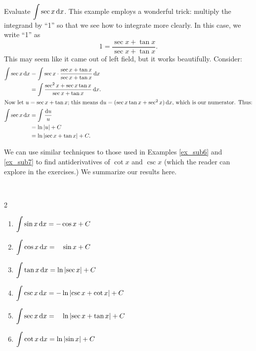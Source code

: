 \begin{example}\label{ex_sub7}%
Evaluate $\displaystyle\int \sec x\operatorname{d}\! x$.
\solution
This example employs a wonderful trick: multiply the integrand by ``1'' so that we see how to integrate more clearly. In this case, we write ``1'' as
\[1 = \frac{\sec x + \tan x}{\sec x + \tan x}.\]
This may seem like it came out of left field, but it works beautifully. Consider:
\begin{align*}
	\int \sec x\operatorname{d}\! x
	&= \int \sec x\cdot \frac{\sec x + \tan x}{\sec x + \tan x}\operatorname{d}\! x \\
	&= \int \frac{\sec^2 x + \sec x\tan x}{\sec x + \tan x}\operatorname{d}\! x.\\
\intertext{Now let \(u = \sec x+\tan x\); this means \(\operatorname{d}\!u = (\sec x\tan x+ \sec^2 x)\operatorname{d}\!x\), which is our numerator. Thus:}
	\int \sec x\operatorname{d}\! x
	&= \int \frac{\operatorname{d}\! u}{u} \\
	&= \ln \left\lvert u \right\rvert + C \\
	&= \ln \left\lvert \sec x+\tan x \right\rvert + C.
\end{align*}
\end{example}

We can use similar techniques to those used in Examples \ref{ex_sub6} and \ref{ex_sub7} to find antiderivatives of $\cot x$ and $\csc x$ (which the reader can explore in the exercises.) We summarize our results here.

{%
\begin{theorem}\label{thm:triganti}%
\mbox{}\\[-2\baselineskip]\parbox[t]{\linewidth}{%
\addtolength{\columnsep}{-4.5em}%
\begin{multicols}{2}\small
	\begin{enumerate}
	\item	$\displaystyle \int \sin x \operatorname{d}\! x = -\cos x +C$
	\item	$\displaystyle\int \cos x\operatorname{d}\! x = \phantom{-}\sin x + C$
	\item	$\displaystyle \int \tan x\operatorname{d}\! x = \ln\left\lvert \sec x \right\rvert+C$
	\item	$\displaystyle \int \csc x \operatorname{d}\! x = -\ln\left\lvert \csc x+\cot x \right\rvert +C$
	\item	$\displaystyle\int \sec x\operatorname{d}\! x = \phantom{-}\ln\left\lvert \sec x+\tan x \right\rvert + C$
	\item	$\displaystyle \int \cot x\operatorname{d}\! x = \ln\left\lvert \sin x \right\rvert+C$
\end{enumerate}
\end{multicols}}
\end{theorem}%
}


